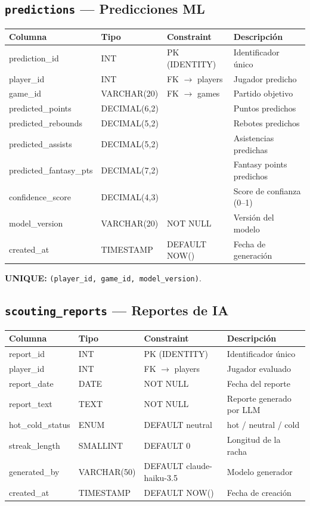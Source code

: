 \documentclass[12pt,a4paper]{article}
\begin{document}
\subsection{\texttt{predictions} --- Predicciones ML}
\begin{tabular}{>{\ttfamily\small}l l l p{4.5cm}}
\toprule
\normalfont\textbf{Columna} & \textbf{Tipo} & \textbf{Constraint} & \textbf{Descripci\'on} \\
\midrule
prediction\_id & INT & PK (IDENTITY) & Identificador \'unico \\
player\_id & INT & FK $\to$ players & Jugador predicho \\
game\_id & VARCHAR(20) & FK $\to$ games & Partido objetivo \\
predicted\_points & DECIMAL(6,2) & & Puntos predichos \\
predicted\_rebounds & DECIMAL(5,2) & & Rebotes predichos \\
predicted\_assists & DECIMAL(5,2) & & Asistencias predichas \\
predicted\_fantasy\_pts & DECIMAL(7,2) & & Fantasy points predichos \\
confidence\_score & DECIMAL(4,3) & & Score de confianza (0--1) \\
model\_version & VARCHAR(20) & NOT NULL & Versi\'on del modelo \\
created\_at & TIMESTAMP & DEFAULT NOW() & Fecha de generaci\'on \\
\bottomrule
\end{tabular}

\textbf{UNIQUE:} \texttt{(player\_id, game\_id, model\_version)}.

\subsection{\texttt{scouting\_reports} --- Reportes de IA}
\begin{tabular}{>{\ttfamily\small}l l l p{4.5cm}}
\toprule
\normalfont\textbf{Columna} & \textbf{Tipo} & \textbf{Constraint} & \textbf{Descripci\'on} \\
\midrule
report\_id & INT & PK (IDENTITY) & Identificador \'unico \\
player\_id & INT & FK $\to$ players & Jugador evaluado \\
report\_date & DATE & NOT NULL & Fecha del reporte \\
report\_text & TEXT & NOT NULL & Reporte generado por LLM \\
hot\_cold\_status & ENUM & DEFAULT neutral & hot / neutral / cold \\
streak\_length & SMALLINT & DEFAULT 0 & Longitud de la racha \\
generated\_by & VARCHAR(50) & DEFAULT claude-haiku-3.5 & Modelo generador \\
created\_at & TIMESTAMP & DEFAULT NOW() & Fecha de creaci\'on \\
\bottomrule
\end{tabular}
\end{document}
